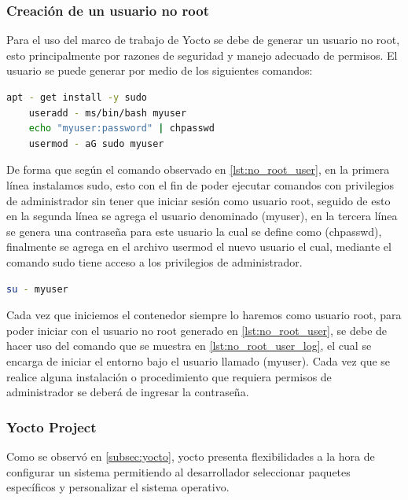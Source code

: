 \subsubsection{Creación de un usuario no root}

Para el uso del marco de trabajo de Yocto se debe de generar un usuario no root, esto principalmente por razones de seguridad y manejo adecuado de permisos. El usuario se puede generar por medio de los siguientes comandos:

\begin{lstlisting}[language=bash, caption={Generacion de usuario no root, Linux}, label=lst:no_root_user]
    apt - get install -y sudo
    useradd - ms/bin/bash myuser
    echo "myuser:password" | chpasswd
    usermod - aG sudo myuser
\end{lstlisting}

De forma que según el comando observado en \ref{lst:no_root_user}, en la primera línea instalamos sudo, esto con el fin de poder ejecutar comandos con privilegios de administrador sin tener que iniciar sesión como usuario root, seguido de esto en la segunda línea se agrega el usuario denominado (myuser), en la tercera línea se genera una contraseña para este usuario la cual se define como (chpasswd), finalmente se agrega en el archivo usermod el nuevo usuario el cual, mediante el comando sudo tiene acceso a los privilegios de administrador. 

\begin{lstlisting}[language=bash, caption={Iniciar usuario no root, Linux}, label=lst:no_root_user_log]
    su - myuser
\end{lstlisting}

Cada vez que iniciemos el contenedor siempre lo haremos como usuario root, para poder iniciar con el usuario no root generado en \ref{lst:no_root_user}, se debe de hacer uso del comando que se muestra en \ref{lst:no_root_user_log}, el cual se encarga de iniciar el entorno bajo el usuario llamado (myuser). Cada vez que se realice alguna instalación o procedimiento que requiera permisos de administrador se deberá de ingresar la contraseña.

\subsubsection{Yocto Project}

Como se observó en \ref{subsec:yocto}, yocto presenta flexibilidades a la hora de configurar un sistema permitiendo al desarrollador seleccionar paquetes específicos y personalizar el sistema operativo.

